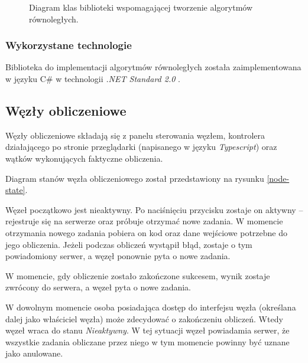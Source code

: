 \documentclass[a4paper,11pt,twoside]{report}
\theoremstyle{definition}
\begin{document}
\begin{figure}[H] 
	\caption{Diagram klas biblioteki wspomagającej tworzenie algorytmów równoległych.}
	\label{library-class}
\end{figure}

\subsubsection{Wykorzystane technologie}
Biblioteka do implementacji algorytmów równoległych została zaimplementowana w języku C\# w technologii \textit{.NET Standard 2.0} \cite{dotnet-standard}.

\subsection{Węzły obliczeniowe}

Węzły obliczeniowe składają się z panelu sterowania węzłem, kontrolera działającego po stronie przeglądarki (napisanego w języku \textit{Typescript}) oraz wątków wykonujących faktyczne obliczenia.

Diagram stanów węzła obliczeniowego został przedstawiony na rysunku \ref{node-state}.

Węzeł początkowo jest nieaktywny. Po naciśnięciu przycisku zostaje on aktywny -- rejestruje się na serwerze oraz próbuje otrzymać nowe zadania. W momencie otrzymania nowego zadania pobiera on kod oraz dane wejściowe potrzebne do jego obliczenia. Jeżeli podczas obliczeń wystąpił błąd, zostaje o tym powiadomiony serwer, a węzęł ponownie pyta o nowe zadania.

W momencie, gdy obliczenie zostało zakończone sukcesem, wynik zostaje zwrócony do serwera, a węzeł pyta o nowe zadania.

W dowolnym momencie osoba posiadająca dostęp do interfejsu węzła (określana dalej jako właściciel węzła) może zdecydować o zakończeniu obliczeń. Wtedy węzeł wraca do stanu \textit{Nieaktywny}. W tej sytuacji węzeł powiadamia serwer, że wszystkie zadania obliczane przez niego w tym momencie powinny być uznane jako anulowane.
\end{document}
